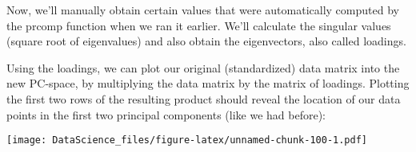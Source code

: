 \documentclass[
]{book}
\newenvironment{Shaded}{\begin{snugshade}}{\end{snugshade}}
\newcommand{\AttributeTok}[1]{\textcolor[rgb]{0.77,0.63,0.00}{#1}}
\newcommand{\FunctionTok}[1]{\textcolor[rgb]{0.00,0.00,0.00}{#1}}
\newcommand{\NormalTok}[1]{#1}
\newcommand{\OtherTok}[1]{\textcolor[rgb]{0.56,0.35,0.01}{#1}}
\newcommand{\SpecialCharTok}[1]{\textcolor[rgb]{0.00,0.00,0.00}{#1}}
\newcommand{\StringTok}[1]{\textcolor[rgb]{0.31,0.60,0.02}{#1}}
\begin{document}
Now, we'll manually obtain certain values that were automatically computed by the prcomp function when we ran it earlier. We'll calculate the singular values (square root of eigenvalues) and also obtain the eigenvectors, also called loadings.

\begin{Shaded}
\end{Shaded}

Using the loadings, we can plot our original (standardized) data matrix into the new PC-space, by multiplying the data matrix by the matrix of loadings. Plotting the first two rows of the resulting product should reveal the location of our data points in the first two principal components (like we had before):

\begin{Shaded}
\end{Shaded}

\texttt{[image: DataScience\_files/figure-latex/unnamed-chunk-100-1.pdf]}
\end{document}

